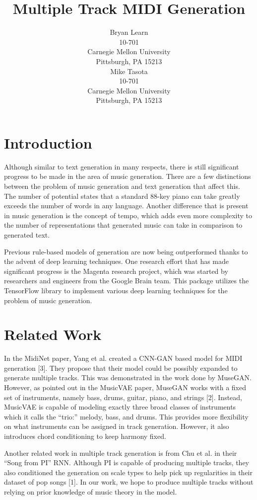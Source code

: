 \documentclass{article}
\title{Multiple Track MIDI Generation}
\author{
  Bryan Learn\\
  10-701\\
  Carnegie Mellon University\\
  Pittsburgh, PA 15213\\
  \And
  Mike Tasota\\
  10-701\\
  Carnegie Mellon University\\
  Pittsburgh, PA 15213\\
}
\begin{document}

\maketitle


\section{Introduction}

Although similar to text generation in many respects, there is still significant progress to be made in the area of music generation. There are a few distinctions between the problem of music generation and text generation that affect this. The number of potential states that a standard 88-key piano can take greatly exceeds the number of words in any language. Another difference that is present in music generation is the concept of tempo, which adds even more complexity to the number of representations that generated music can take in comparison to generated text.

Previous rule-based models of generation are now being outperformed thanks to the advent of deep learning techniques. One research effort that has made significant progress is the Magenta research project, which was started by researchers and engineers from the Google Brain team. This package utilizes the TensorFlow library to implement various deep learning techniques for the problem of music generation.


\section{Related Work}
In the MidiNet paper, Yang et al. created a CNN-GAN based model for MIDI generation [3]. They propose that their model could be possibly expanded to generate multiple tracks. This was demonstrated in the work done by MuseGAN. However, as pointed out in the MusicVAE paper, MuseGAN works with a fixed set of instruments, namely bass, drums, guitar, piano, and strings [2]. Instead, MusicVAE is capable of modeling exactly three broad classes of instruments which it calls the “trio:” melody, bass, and drums. This provides more flexibility on what instruments can be assigned in track generation. However, it also introduces chord conditioning to keep harmony fixed.

Another related work in multiple track generation is from Chu et al. in their “Song from PI” RNN. Although PI is capable of producing multiple tracks, they also conditioned the generation on scale types to help pick up regularities in their dataset of pop songs [1]. In our work, we hope to produce multiple tracks without relying on prior knowledge of music theory in the model.
\end{document}
